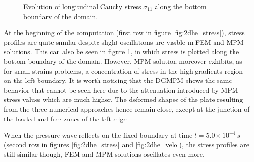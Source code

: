 \begin{figure}[h!]
  \centering
  
  \caption{Evolution of longitudinal Cauchy stress $\sigma_{11}$ along the bottom boundary of the domain.}
  \label{fig:he_lineplots_stress}
\end{figure}
At the beginning of the computation (first row in figure \ref{fig:2dhe_stress}), stress profiles are quite similar despite slight oscillations are visible in FEM and MPM solutions.
This can also be seen in figure \ref{fig:he_lineplots_stress}, in which stress is plotted along the bottom boundary of the domain.
However, MPM solution moreover exhibits, as for small strains problems, a concentration of stress in the high gradients region on the left boundary.
It is worth noticing that the DGMPM shows the same behavior that cannot be seen here due to the attenuation introduced by MPM stress values which are much higher.
The deformed shapes of the plate resulting from the three numerical approaches hence remain close, except at the junction of the loaded and free zones of the left edge.

When the pressure wave reflects on the fixed boundary at time $t=5.0\times 10^{-4}\:s$ (second row in figures \ref{fig:2dhe_stress} and \ref{fig:2dhe_velo}), the stress profiles are still similar though, FEM and MPM solutions oscillates even more.

